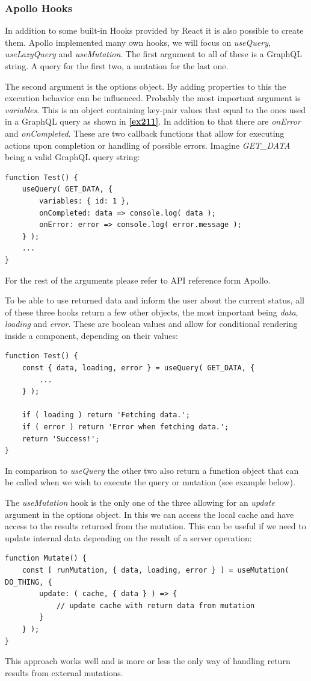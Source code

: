 \subsubsection{Apollo Hooks}
In addition to some built-in Hooks provided by React it is also possible to create them. Apollo implemented many own hooks, we will focus on \emph{useQuery}, \emph{useLazyQuery} and \emph{useMutation}.
The first argument to all of these is a GraphQL string. A query for the first two, a mutation for the last one.

The second argument is the options object. By adding properties to this the execution behavior can be influenced. Probably the most important argument is \emph{variables}. This is an object containing key-pair values that equal to the ones used in a GraphQL query as shown in \textbf{\ref{ex211}}. In addition to that there are \emph{onError} and \emph{onCompleted}. These are two callback functions that allow for executing actions upon completion or handling of possible errors. Imagine \emph{GET\_DATA} being a valid GraphQL query string:
\begin{lstlisting}
function Test() {
	useQuery( GET_DATA, {
		variables: { id: 1 },
		onCompleted: data => console.log( data );
		onError: error => console.log( error.message );
	} );
	...
}
\end{lstlisting}

For the rest of the arguments please refer to API reference form Apollo.

To be able to use returned data and inform the user about the current status, all of these three hooks return a few other objects, the most important being \emph{data}, \emph{loading} and \emph{error}. These are boolean values and allow for conditional rendering inside a component, depending on their values: 
\begin{lstlisting}
function Test() {
	const { data, loading, error } = useQuery( GET_DATA, {
		...	
	} );
	
	if ( loading ) return 'Fetching data.';
	if ( error ) return 'Error when fetching data.';
	return 'Success!';
}
\end{lstlisting}

In comparison to \emph{useQuery} the other two also return a function object that can be called when we wish to execute the query or mutation (see example below).

The \emph{useMutation} hook is the only one of the three allowing for an \emph{update} argument in the options object. In this we can access the local cache and have access to the results returned from the mutation. This can be useful if we need to update internal data depending on the result of a server operation:
\begin{lstlisting}[caption={Creating a Mutation}]
function Mutate() {
	const [ runMutation, { data, loading, error } ] = useMutation( DO_THING, {
		update: ( cache, { data } ) => {
			// update cache with return data from mutation
		}	
	} );
}
\end{lstlisting}
This approach works well and is more or less the only way of handling return results from external mutations. 

